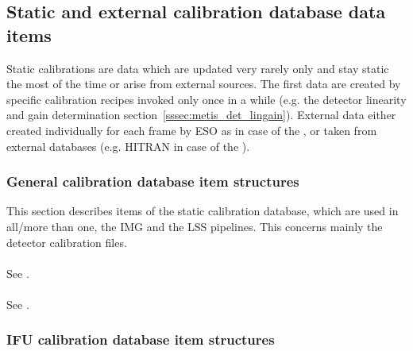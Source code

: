 
\subsection{Static and external calibration database data items}\label{ssec:caldb_items_structures}
Static calibrations are data which are updated very rarely only and stay static the most of the time or arise from external sources. The first data are created by specific calibration recipes invoked only once in a while (e.g. the detector linearity and gain determination section~\ref{sssec:metis_det_lingain}). External data either created individually for each frame by \ac{ESO} as in case of the \hyperref[dataitem:persistence_map]{}, or taken from external databases (e.g. \ac{HITRAN} in case of the \hyperref[dataitem:atm_line_cat]{}).

\subsubsection{General calibration database item structures}\label{sssec:generalcaldbdatastructs}
This section describes items of the static calibration database, which are used in all/more than one, the \ac{IMG} and the \ac{LSS} pipelines. This concerns mainly the detector calibration files.

\paragraph{\hyperref[dataitem:gain_map_det]{}}\label{dataitem:gain_map_det}\label{dataitem:gainmap}

\paragraph{\hyperref[dataitem:gain_map_2rg]{}}\label{dataitem:gain_map_2rg}
See \hyperref[dataitem:gain_map_det]{}.

\paragraph{\hyperref[dataitem:gain_map_geo]{}}\label{dataitem:gain_map_geo}
See \hyperref[dataitem:gain_map_det]{}.

\subsubsection{IFU calibration database item structures}\label{sssec:lmscaldbdatastructs}


